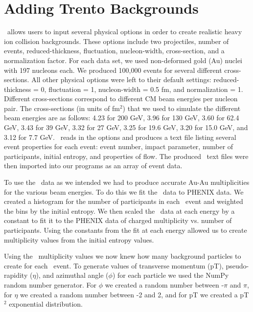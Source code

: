 \documentclass[11pt]{article}
\begin{document}
\section{Adding Trento Backgrounds}
%
%
\trento\ allows users to input several physical options in order to create realistic heavy ion collision backgrounds. These options include two projectiles, number of events, reduced-thickness, fluctuation, nucleon-width, cross-section, and a normalization factor. For each data set,  we used non-deformed gold (Au) nuclei with 197 nucleons each. We produced 100,000 events for several different cross-sections. All other physical options were left to their default settings: reduced-thickness = 0, fluctuation = 1, nucleon-width = 0.5 fm, and normalization = 1. Different cross-sections correspond to different CM beam energies per nucleon pair. The cross-sections (in units of fm$^2$) that we used to simulate the different beam energies are as follows: 4.23 for 200 GeV, 3.96 for 130 GeV, 3.60 for 62.4 GeV, 3.43 for 39 GeV, 3.32 for 27 GeV, 3.25 for 19.6 GeV, 3.20 for 15.0 GeV, and 3.12 for 7.7 GeV. \trento\ reads in the options and produces a text file listing several event properties for each event: event number, impact parameter, number of participants, initial entropy, and properties of flow. The produced \trento\ text files were then imported into our programs as an array of event data.

To use the \trento\ data as we intended we had to produce accurate Au-Au multiplicities for the various beam energies. To do this we fit the \trento\ data to PHENIX data. We created a histogram for the number of participants in each \trento\ event and weighted the bins by the initial entropy. We then scaled the \trento\ data at each energy by a constant to fit it to the PHENIX data of charged multiplicity vs. number of participants. Using the constants from the fit at each energy allowed us to create multiplicity values from the initial entropy values.

Using the \trento\ multiplicity values we now knew how many background particles to create for each \trento\ event. To generate values of transverse momentum (pT), pseudo-rapidity ($\eta$), and azimuthal angle ($\phi$) for each particle we used the NumPy random number generator. For $\phi$ we created a random number between -$\pi$ and $\pi$, for $\eta$ we created a random number between -2 and 2, and for pT we created a pT$^2$ exponential distribution.
\end{document}
